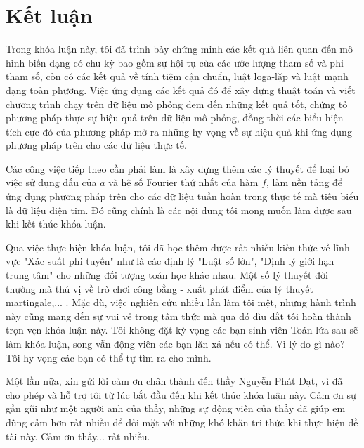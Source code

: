 \chapter*{Kết luận}
Trong khóa luận này, tôi đã trình bày chứng minh các kết quả liên quan đến mô hình biến dạng có chu kỳ  bao gồm sự hội tụ của các ước lượng tham số và phi tham số, còn có các kết quả về tính tiệm cận chuẩn, luật loga-lặp và luật mạnh dạng toàn phương. Việc ứng dụng các kết quả đó để xây dựng thuật toán và viết chương trình chạy trên dữ liệu mô phỏng đem đến những kết quả tốt, chứng tỏ phương pháp thực sự hiệu quả trên dữ liệu mô phỏng, đồng thời các biểu hiện tích cực đó của phương pháp mở ra những hy vọng về sự hiệu quả khi ứng dụng phương pháp trên cho các dữ liệu thực tế.

Các công việc tiếp theo cần phải làm là xây dựng thêm các lý thuyết để loại bỏ việc sử dụng dấu của $a$ và hệ số Fourier thứ nhất của hàm $f$, làm nền tảng để ứng dụng phương pháp trên cho các dữ liệu tuần hoàn trong thực tế mà tiêu biểu là dữ liệu điện tim. Đó cũng chính là các nội dung tôi mong muốn làm được sau khi kết thúc khóa luận.

Qua việc thực hiện khóa luận, tôi đã học thêm được rất nhiều kiến thức về lĩnh vực "Xác suất phi tuyến" như là các định lý "Luật số lớn", "Định lý giới hạn trung tâm" cho những đối tượng toán học khác nhau. Một số lý thuyết đời thường mà thú vị về trò chơi công bằng - xuất phát điểm của lý thuyết martingale,... . Mặc dù, việc nghiên cứu nhiều lần làm tôi mệt, nhưng hành trình này cũng mang đến sự vui vẻ trong tâm thức mà qua đó dìu dắt tôi hoàn thành trọn vẹn khóa luận này. Tôi không đặt kỳ vọng các bạn sinh viên Toán lứa sau sẽ làm khóa luận, song vẫn động viên các bạn lăn xả nếu có thể. Vì lý do gì nào? Tôi hy vọng các bạn có thể tự tìm ra cho mình.

Một lần nữa, xin gửi lời cảm ơn chân thành đến thầy Nguyễn Phát Đạt, vì đã cho phép và hỗ trợ tôi từ lúc bắt đầu đến khi kết thúc khóa luận này. Cảm ơn sự gần gũi như một người anh của thầy, những sự động viên của thầy đã giúp em dũng cảm hơn rất nhiều để đối mặt với những khó khăn tri thức khi thực hiện đề tài này. Cảm ơn thầy... rất nhiều.